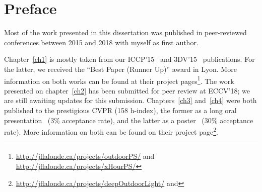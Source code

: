 \chapter*{Preface}         %

Most of the work presented in this dissertation was published in peer-reviewed conferences between 2015 and 2018 with myself as first author. %


Chapter~\ref{ch1} is mostly taken from our ICCP'15~\cite{holdgeoffroy-iccp-15} and 3DV'15~\cite{holdgeoffroy-3dv-15} publications. For the latter, we received the ``Best Paper (Runner Up)'' award in Lyon. More information on both works can be found at their project pages\footnote{\url{http://jflalonde.ca/projects/outdoorPS/} and \url{http://jflalonde.ca/projects/xHourPS/}}. The work presented on chapter~\ref{ch2} has been submitted for peer review at ECCV'18; we are still awaiting updates for this submission. Chapters~\ref{ch3} and~\ref{ch4} were both published to the prestigious CVPR (158 h-index), the former as a long oral presentation~\cite{holdgeoffroy-cvpr-17} (3\% acceptance rate), and the latter as a poster~\cite{holdgeoffroy-cvpr-18} (30\% acceptance rate). More information on both can be found on their project page\footnote{\url{http://jflalonde.ca/projects/deepOutdoorLight/} and }.


%
%
